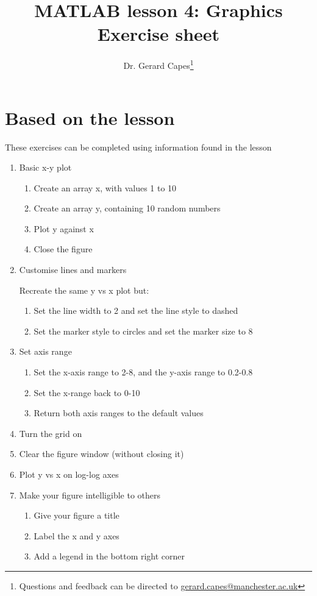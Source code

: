 \documentclass[a4paper]{article}
\title{MATLAB lesson 4: Graphics\\Exercise sheet}
\date{}
\author{Dr. Gerard Capes\thanks{Questions and feedback can be directed to \href{mailto:gerard.capes@manchester.ac.uk?subject=Feedback on MATLAB lesson 4 (plotting) exercise sheet}{gerard.capes@manchester.ac.uk}}}
\begin{document}
\maketitle

\section{Based on the lesson}
{\large These exercises can be completed using information found in the lesson}

\begin{enumerate}
	\item Basic x-y plot
	\begin{enumerate}
		\item Create an array x, with values 1 to 10
		\item Create an array y, containing 10 random numbers
		\item Plot y against x
		\item Close the figure	
	\end{enumerate}
	
	\item Customise lines and markers
	
	Recreate the same y vs x plot but:
	\begin{enumerate}
		
		\item Set the line width to 2 and set the line style to dashed
		\item Set the marker style to circles and set the marker size to 8
	\end{enumerate}

	\item Set axis range
	\begin{enumerate}
	
		\item Set the x-axis range to 2-8, and the y-axis range to 0.2-0.8	
		\item Set the x-range back to 0-10
		\item Return both axis ranges to the default values
	\end{enumerate}
	
	\item Turn the grid on
	\item Clear the figure window (without closing it)
	\item Plot y vs x on log-log axes
	
	\item Make your figure intelligible to others
	\begin{enumerate}
		\item Give your figure a title
		\item Label the x and y axes
		\item Add a legend in the bottom right corner
	\end{enumerate}
	

\end{enumerate}
\end{document}
